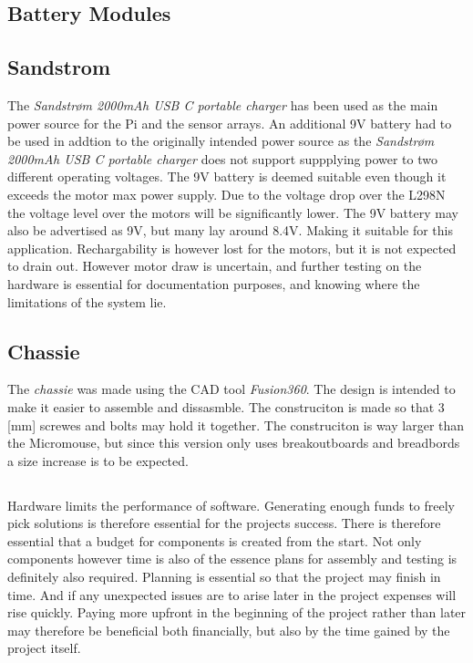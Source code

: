 \subsection{Battery Modules}

\subsection{Sandstrom}
The \emph{Sandstrøm 2000mAh USB C portable charger} has been used as the main power source for the Pi and the sensor arrays. An additional 9V battery had to
be used in addtion to the originally intended power source as the \emph{Sandstrøm 2000mAh USB C portable charger} does not support suppplying power to two
different operating voltages. The 9V battery is deemed suitable even though it exceeds the motor max power supply. Due to the voltage drop over the L298N the
voltage level over the motors will be significantly lower. The 9V battery may also be advertised as 9V, but many lay around 8.4V. Making it suitable for this
application. Rechargability is however lost for the motors, but it is not expected to drain out. However motor draw is uncertain, and further testing on the
hardware is essential for documentation purposes, and knowing where the limitations of the system lie. 


\subsection{Chassie}
The \emph{chassie} was made using the CAD tool \emph{Fusion360}. The design is intended to make it easier to assemble and dissasmble. The construciton is 
made so that 3 [mm] screwes and bolts may hold it together. The construciton is way larger than the Micromouse, but since this version only uses breakoutboards
and breadbords a size increase is to be expected.

\subsection{}


\label{sec: Testing and Troubleshooting}
Hardware limits the performance of software. Generating enough funds to freely pick solutions is therefore essential for the projects success. There is therefore essential that a 
budget for components is created from the start. Not only components however time is also of the essence plans for assembly and testing is definitely also required. Planning is essential
so that the project may finish in time. And if any unexpected issues are to arise later in the project expenses will rise quickly. Paying more upfront in the beginning of the project 
rather than later may therefore be beneficial both financially, but also by the time gained by the project itself. 

